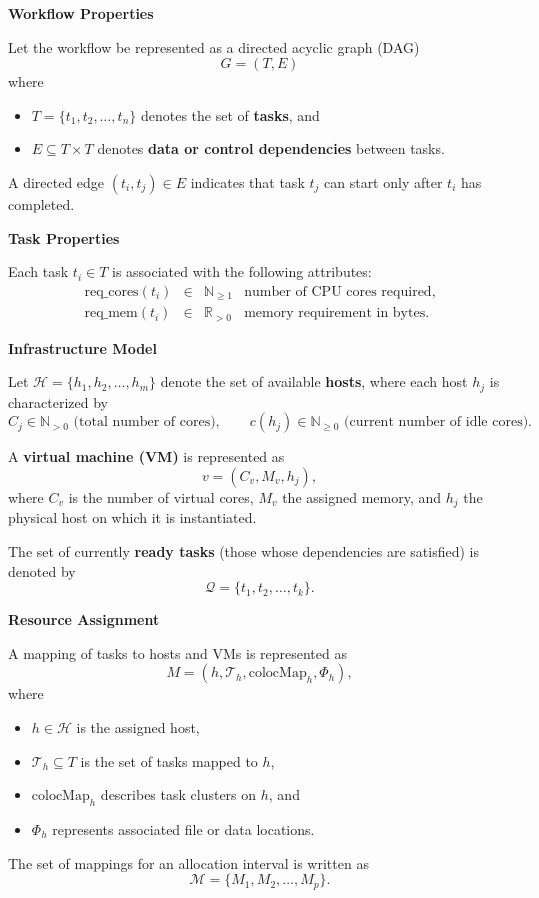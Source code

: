 
\textbf{Workflow Properties}

Let the workflow be represented as a directed acyclic graph (DAG)
\[
    G = (T, E)
\]
where
\begin{itemize}
    \item $T = \{t_1, t_2, \dots, t_n\}$ denotes the set of \textbf{tasks}, and
    \item $E \subseteq T \times T$ denotes \textbf{data or control dependencies} between tasks.
\end{itemize}
A directed edge $(t_i, t_j) \in E$ indicates that task $t_j$ can start only after $t_i$ has completed.

\textbf{Task Properties}

Each task \( t_i \in T \) is associated with the following attributes:
\[
    \begin{array}{rcll}
        \text{req\_cores}(t_i) & \in & \mathbb{N}_{\ge 1} & \text{number of CPU cores required}, \\[4pt]
        \text{req\_mem}(t_i)   & \in & \mathbb{R}_{>0}    & \text{memory requirement in bytes.}
    \end{array}
\]

\textbf{Infrastructure Model}

Let \( \mathcal{H} = \{h_1, h_2, \dots, h_m\} \) denote the set of available \textbf{hosts},
where each host \( h_j \) is characterized by
\[
    C_j \in \mathbb{N}_{>0} \text{ (total number of cores)}, \qquad
    c(h_j) \in \mathbb{N}_{\ge 0} \text{ (current number of idle cores).}
\]

A \textbf{virtual machine (VM)} is represented as
\[
    v = (C_v, M_v, h_j),
\]
where \( C_v \) is the number of virtual cores, \( M_v \) the assigned memory,
and \( h_j \) the physical host on which it is instantiated.

The set of currently \textbf{ready tasks} (those whose dependencies are satisfied) is denoted by
\[
    \mathcal{Q} = \{t_1, t_2, \dots, t_k\}.
\]

\textbf{Resource Assignment}

A mapping of tasks to hosts and VMs is represented as
\[
    M = (h, \mathcal{T}_h, \text{colocMap}_h, \Phi_h),
\]
where
\begin{itemize}
    \item $h \in \mathcal{H}$ is the assigned host,
    \item $\mathcal{T}_h \subseteq T$ is the set of tasks mapped to $h$,
    \item $\text{colocMap}_h$ describes task clusters on $h$, and
    \item $\Phi_h$ represents associated file or data locations.
\end{itemize}
The set of mappings for an allocation interval is written as
\[
    \mathcal{M} = \{ M_1, M_2, \dots, M_p \}.
\]

